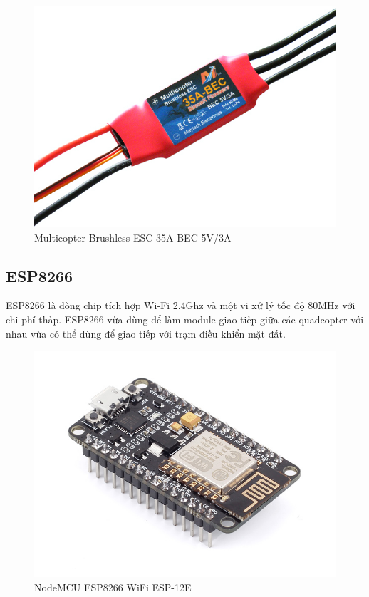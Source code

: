     \begin{figure}[h!]
    	\begin{center}
    		\includegraphics[scale=0.4]{images/esc.jpg}
    		\caption{Multicopter Brushless ESC 35A-BEC 5V/3A}
    	\end{center}
    \end{figure}
    
    \subsection{ESP8266}
    ESP8266 là dòng chip tích hợp Wi-Fi 2.4Ghz và một vi xử lý tốc độ 80MHz với chi phí thấp. ESP8266 vừa dùng để làm module giao tiếp giữa các quadcopter với nhau vừa có thể dùng để giao tiếp với trạm điều khiển mặt đất.

    \begin{figure}[h!]
    	\begin{center}
    		\includegraphics[scale=0.2]{images/esp8266.jpg}
    		\caption{NodeMCU ESP8266 WiFi ESP-12E}
    	\end{center}
    \end{figure}
    
